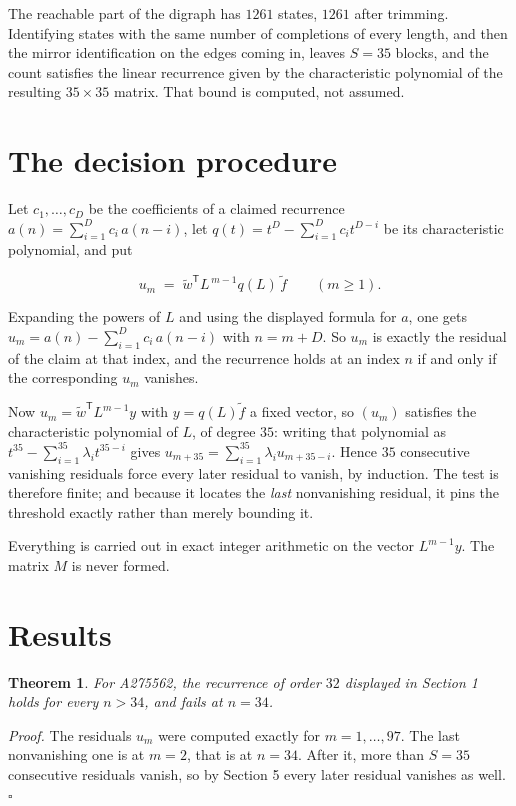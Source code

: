 \documentclass[11pt]{article}
\newtheorem{theorem}{Theorem}
\theoremstyle{definition}
\begin{document}
The reachable part of the digraph has $1261$ states, $1261$ after trimming. Identifying states with the same number of completions of every length, and then the mirror identification on the edges coming in, leaves $S = 35$ blocks, and the count satisfies the linear recurrence given by the characteristic polynomial of the resulting $35\times35$ matrix. That bound is computed, not assumed.

\section{The decision procedure}

Let $c_1,\dots,c_D$ be the coefficients of a claimed recurrence $a(n) = \sum_{i=1}^{D} c_i\,a(n-i)$, let $q(t) = t^{D} - \sum_{i=1}^{D} c_i t^{D-i}$ be its characteristic polynomial, and put

\[u_m \;=\; \tilde w^{\mathsf T} L^{\,m-1} q(L)\,\tilde f \qquad (m \ge 1).\]

Expanding the powers of $L$ and using the displayed formula for $a$, one gets $u_m = a(n) - \sum_{i=1}^{D} c_i\,a(n-i)$ with $n = m + D$. So $u_m$ is exactly the residual of the claim at that index, and the recurrence holds at an index $n$ if and only if the corresponding $u_m$ vanishes.

Now $u_m = \tilde w^{\mathsf T} L^{m-1} y$ with $y = q(L)\tilde f$ a fixed vector, so $(u_m)$ satisfies the characteristic polynomial of $L$, of degree $35$: writing that polynomial as $t^{35} - \sum_{i=1}^{35} \lambda_i t^{35-i}$ gives $u_{m+35} = \sum_{i=1}^{35} \lambda_i u_{m+35-i}$. Hence $35$ consecutive vanishing residuals force every later residual to vanish, by induction. The test is therefore finite; and because it locates the {\itshape last} nonvanishing residual, it pins the threshold exactly rather than merely bounding it.

Everything is carried out in exact integer arithmetic on the vector $L^{m-1}y$. The matrix $M$ is never formed.

\section{Results}

\begin{theorem} For A275562, the recurrence of order $32$ displayed in Section 1 holds for every $n > 34$, and fails at $n = 34$.\end{theorem}

{\itshape Proof.} The residuals $u_m$ were computed exactly for $m = 1,\dots,97$. The last nonvanishing one is at $m = 2$, that is at $n = 34$. After it, more than $S = 35$ consecutive residuals vanish, so by Section 5 every later residual vanishes as well. $\square$
\end{document}
